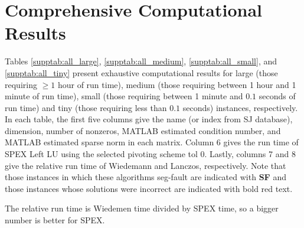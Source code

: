 \documentclass[10pt]{article}
\newcommand{\red}{
	\color{red}	
	}
\begin{document}
\appendix

\section{Comprehensive Computational Results} \label{s:ResultsALL}

Tables \ref{supptab:all_large}, \ref{supptab:all_medium},
\ref{supptab:all_small}, and \ref{supptab:all_tiny} present exhaustive
computational results for large (those requiring $\geq1$ hour of run time),
medium (those requiring between 1 hour and 1 minute of run time), small (those
requiring between 1 minute and $0.1$ seconds of run time) and tiny (those
requiring less than $0.1$ seconds) instances, respectively. In each table, the
first five columns give the name (or index from SJ database), dimension, number
of nonzeros, MATLAB estimated condition number, and MATLAB estimated sparse
norm in each matrix. Column 6 gives the run time of SPEX Left LU using the
selected pivoting scheme tol 0. Lastly, columns 7 and 8 give the relative run
time of Wiedemann and Lanczos, respectively. Note that those instances in which
these algorithms seg-fault are indicated with {\bf \red SF} and those instances
whose solutions were incorrect are indicated with bold red text.

The relative run time is Wiedemen time divided by SPEX time,
so a bigger number is better for SPEX.
\end{document}
